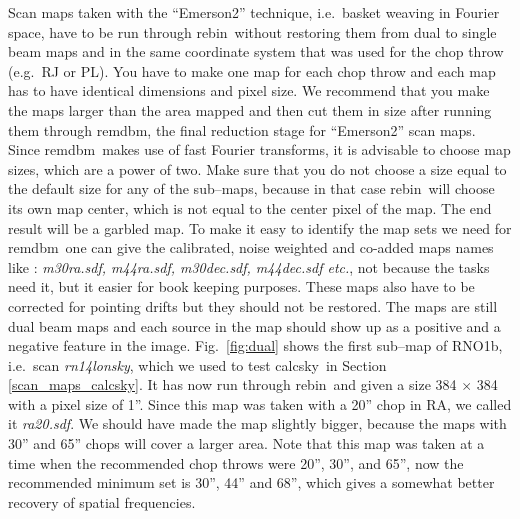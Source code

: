 \documentclass[twoside,11pt]{article}
\newcommand{\task}[1]{\textsf{#1}}
\newcommand{\rebin}{\xref{\task{rebin}}{sun216}{REBIN}}
\newcommand{\remdbm}{\xref{\task{remdbm}}{sun216}{REMDBM}}
\newcommand{\calcsky}{\xref{\task{calcsky}}{sun216}{CALCSKY}}
\newcommand{\xref}[3]{#1}
\renewcommand{\_}{\texttt{\symbol{95}}}
\begin{document}
Scan maps taken with the ``Emerson2'' technique, i.e.\ basket weaving
in Fourier space, have to be run through \rebin\ without restoring
them from dual to single beam maps and in the same coordinate system
that was used for the chop throw (e.g.\ RJ or PL).  You have to make
one map for each chop throw and each map has to have identical
dimensions and pixel size.  We recommend that you make the maps larger
than the area mapped and then cut them in size after running them
through \remdbm, the final reduction stage for ``Emerson2'' scan maps.
Since \remdbm\ makes use of fast Fourier transforms, it is advisable
to choose map sizes, which are a power of two.  Make sure that you do
not choose a size equal to the default size for any of the sub--maps,
because in that case \rebin\ will choose its own map center, which is
not equal to the center pixel of the map. The end result will be a
garbled map.  To make it easy to identify the map sets we need for
\remdbm\ one can give the calibrated, noise weighted and co-added maps
names like : {\it m30ra.sdf, m44ra.sdf, m30dec.sdf, m44dec.sdf etc.},
not because the tasks need it, but it easier for book keeping
purposes.  These maps also have to be corrected for pointing drifts
but they should not be restored.  The maps are still dual beam maps
and each source in the map should show up as a positive and a negative
feature in the image.  Fig.\ \ref{fig:dual} shows the first sub--map
of RNO1b, i.e.\ scan {\it rn14\_lon\_sky}, which we used to test
\calcsky\ in Section \ref{scan_maps_calcsky}.  It has now run through
\rebin\ and given a size 384 $\times$ 384 with a pixel size of 1''.
Since this map was taken with a 20'' chop in RA, we called it {\it
ra20.sdf}.  We should have made the map slightly bigger, because the
maps with 30'' and 65'' chops will cover a larger area.  Note that
this map was taken at a time when the recommended chop throws were
20'', 30'', and 65'', now the recommended minimum set is 30'', 44''
and 68'', which gives a somewhat better recovery of spatial
frequencies.
\end{document}
